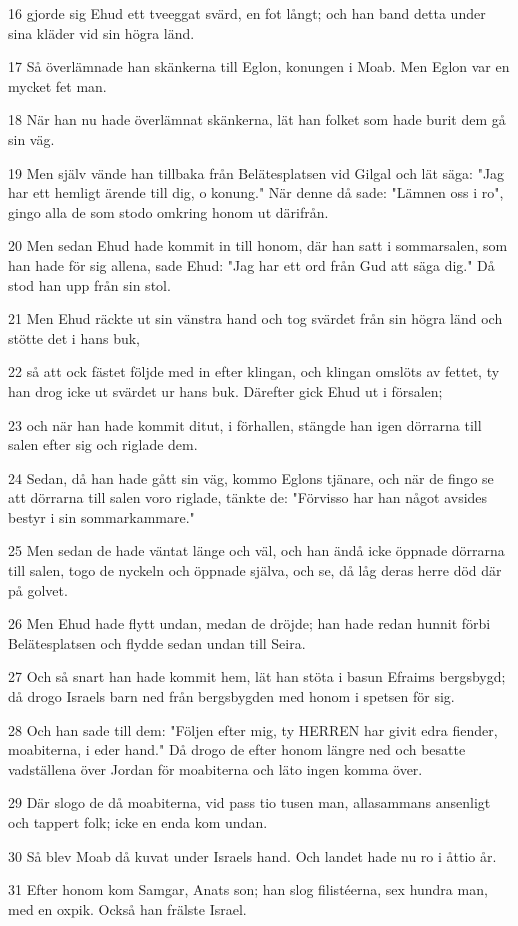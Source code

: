 \par 16 gjorde sig Ehud ett tveeggat svärd, en fot långt; och han band detta under sina kläder vid sin högra länd.
\par 17 Så överlämnade han skänkerna till Eglon, konungen i Moab. Men Eglon var en mycket fet man.
\par 18 När han nu hade överlämnat skänkerna, lät han folket som hade burit dem gå sin väg.
\par 19 Men själv vände han tillbaka från Belätesplatsen vid Gilgal och lät säga: "Jag har ett hemligt ärende till dig, o konung." När denne då sade: "Lämnen oss i ro", gingo alla de som stodo omkring honom ut därifrån.
\par 20 Men sedan Ehud hade kommit in till honom, där han satt i sommarsalen, som han hade för sig allena, sade Ehud: "Jag har ett ord från Gud att säga dig." Då stod han upp från sin stol.
\par 21 Men Ehud räckte ut sin vänstra hand och tog svärdet från sin högra länd och stötte det i hans buk,
\par 22 så att ock fästet följde med in efter klingan, och klingan omslöts av fettet, ty han drog icke ut svärdet ur hans buk. Därefter gick Ehud ut i försalen;
\par 23 och när han hade kommit ditut, i förhallen, stängde han igen dörrarna till salen efter sig och riglade dem.
\par 24 Sedan, då han hade gått sin väg, kommo Eglons tjänare, och när de fingo se att dörrarna till salen voro riglade, tänkte de: "Förvisso har han något avsides bestyr i sin sommarkammare."
\par 25 Men sedan de hade väntat länge och väl, och han ändå icke öppnade dörrarna till salen, togo de nyckeln och öppnade själva, och se, då låg deras herre död där på golvet.
\par 26 Men Ehud hade flytt undan, medan de dröjde; han hade redan hunnit förbi Belätesplatsen och flydde sedan undan till Seira.
\par 27 Och så snart han hade kommit hem, lät han stöta i basun Efraims bergsbygd; då drogo Israels barn ned från bergsbygden med honom i spetsen för sig.
\par 28 Och han sade till dem: "Följen efter mig, ty HERREN har givit edra fiender, moabiterna, i eder hand." Då drogo de efter honom längre ned och besatte vadställena över Jordan för moabiterna och läto ingen komma över.
\par 29 Där slogo de då moabiterna, vid pass tio tusen man, allasammans ansenligt och tappert folk; icke en enda kom undan.
\par 30 Så blev Moab då kuvat under Israels hand. Och landet hade nu ro i åttio år.
\par 31 Efter honom kom Samgar, Anats son; han slog filistéerna, sex hundra man, med en oxpik. Också han frälste Israel.

